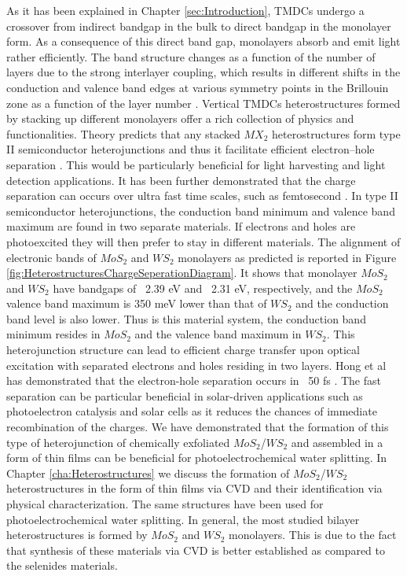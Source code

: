 As it has been explained in Chapter \ref{sec:Introduction}, TMDCs undergo a crossover from indirect bandgap in the bulk to direct bandgap in the monolayer form. As a consequence of this direct band gap, monolayers absorb and emit light rather efficiently. The band structure changes as a function of the number of layers due to the strong interlayer coupling, which results in different shifts in the conduction and valence band edges at various symmetry points in the Brillouin zone as a function of the layer number \cite{WS2BandStructureSimulation}. Vertical TMDCs heterostructures formed by stacking up different monolayers offer a rich collection of physics and functionalities. Theory predicts that any stacked $MX_2$ heterostructures form type II semiconductor heterojunctions and thus it facilitate efficient electron–hole separation \cite{Amin2015}. This would be particularly beneficial for light harvesting and light detection applications. It has been further demonstrated that the charge separation can occurs over ultra fast time scales, such as femtosecond \cite{Hong2014}.
In type II semiconductor heterojunctions, the conduction band minimum and valence band maximum are found in two separate materials. If electrons and holes are photoexcited they will then prefer to stay in different materials. The alignment of electronic bands of $MoS_2$ and $WS_2$ monolayers as predicted \cite{Gong2013} is reported in Figure \ref{fig:HeterostructuresChargeSeperationDiagram}. It shows that monolayer $MoS_2$ and $WS_2$ have bandgaps of ~2.39 eV and ~2.31 eV, respectively, and the $MoS_2$ valence band maximum is 350 meV lower than that of $WS_2$ and the conduction band level is also lower. Thus is this material system, the conduction band minimum resides in $MoS_2$ and the valence band maximum in $WS_2$. This heterojunction structure can lead to efficient charge transfer upon optical excitation with separated electrons and holes residing in two layers. Hong et al has demonstrated that the electron-hole separation occurs in ~50 fs \cite{Hong2014}. The fast separation can be particular beneficial in solar-driven applications such as photoelectron catalysis and solar cells as it reduces the chances of immediate recombination of the charges.
We have demonstrated that the formation of this type of heterojunction of chemically exfoliated $MoS_2$/$WS_2$ and assembled in a form of thin films can be beneficial for photoelectrochemical water splitting. In Chapter \ref{cha:Heterostructures} we discuss the formation of $MoS_2$/$WS_2$ heterostructures in the form of thin films via CVD and their identification via physical characterization. The same structures have been used for photoelectrochemical water splitting. In general, the most studied bilayer heterostructures is formed by $MoS_2$ and $WS_2$ monolayers. This is due to the fact that synthesis of these materials via CVD is better established as compared to the selenides materials. 

